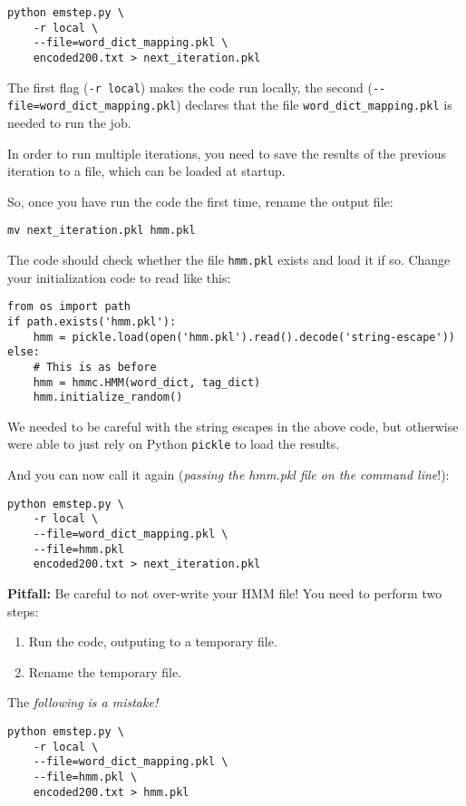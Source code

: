 \begin{verbatim}
python emstep.py \
    -r local \
    --file=word_dict_mapping.pkl \
    encoded200.txt > next_iteration.pkl
\end{verbatim}

The first flag (\verb+-r local+) makes the code run locally, the second
(\verb+--file=word_dict_mapping.pkl+) declares that the file
\verb+word_dict_mapping.pkl+ is needed to run the job.

In order to run multiple iterations, you need to save the results of the
previous iteration to a file, which can be loaded at startup.

So, once you have run the code the first time, rename the output file:

\begin{verbatim}
mv next_iteration.pkl hmm.pkl
\end{verbatim}

The code should check whether the file \verb+hmm.pkl+ exists and load it if so.
Change your initialization code to read like this:

\begin{verbatim}
from os import path
if path.exists('hmm.pkl'):
    hmm = pickle.load(open('hmm.pkl').read().decode('string-escape'))
else:
    # This is as before
    hmm = hmmc.HMM(word_dict, tag_dict)
    hmm.initialize_random()
\end{verbatim}

We needed to be careful with the string escapes in the above code, but
otherwise were able to just rely on Python \verb+pickle+ to load the results.

And you can now call it again (\emph{passing the hmm.pkl file on the command
line}!):

\begin{verbatim}
python emstep.py \
    -r local \
    --file=word_dict_mapping.pkl \
    --file=hmm.pkl
    encoded200.txt > next_iteration.pkl
\end{verbatim}

\textbf{Pitfall:} Be careful to not over-write your HMM file! You need to
perform two steps:

\begin{enumerate}
\item Run the code, outputing to a temporary file.
\item Rename the temporary file.
\end{enumerate}

The \emph{following is a mistake!}
\begin{verbatim}
python emstep.py \
    -r local \
    --file=word_dict_mapping.pkl \
    --file=hmm.pkl \
    encoded200.txt > hmm.pkl
\end{verbatim}

